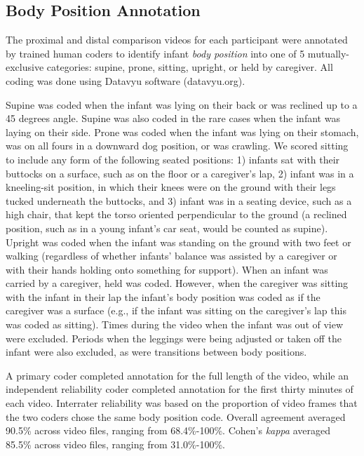 \documentclass[
  man]{apa6}
\begin{document}
\hypertarget{body-position-annotation}{%
\subsection{Body Position Annotation}\label{body-position-annotation}}

The proximal and distal comparison videos for each participant were annotated by trained human coders to identify infant \emph{body position} into one of 5 mutually-exclusive categories: supine, prone, sitting, upright, or held by caregiver. All coding was done using Datavyu software (datavyu.org).

Supine was coded when the infant was lying on their back or was reclined up to a 45 degrees angle. Supine was also coded in the rare cases when the infant was laying on their side. Prone was coded when the infant was lying on their stomach, was on all fours in a downward dog position, or was crawling. We scored sitting to include any form of the following seated positions: 1) infants sat with their buttocks on a surface, such as on the floor or a caregiver's lap, 2) infant was in a kneeling-sit position, in which their knees were on the ground with their legs tucked underneath the buttocks, and 3) infant was in a seating device, such as a high chair, that kept the torso oriented perpendicular to the ground (a reclined position, such as in a young infant's car seat, would be counted as supine). Upright was coded when the infant was standing on the ground with two feet or walking (regardless of whether infants' balance was assisted by a caregiver or with their hands holding onto something for support). When an infant was carried by a caregiver, held was coded. However, when the caregiver was sitting with the infant in their lap the infant's body position was coded as if the caregiver was a surface (e.g., if the infant was sitting on the caregiver's lap this was coded as sitting). Times during the video when the infant was out of view were excluded. Periods when the leggings were being adjusted or taken off the infant were also excluded, as were transitions between body positions.

A primary coder completed annotation for the full length of the video, while an independent reliability coder completed annotation for the first thirty minutes of each video. Interrater reliability was based on the proportion of video frames that the two coders chose the same body position code. Overall agreement averaged 90.5\% across video files, ranging from 68.4\%-100\%. Cohen's \emph{kappa} averaged 85.5\% across video files, ranging from 31.0\%-100\%.
\end{document}
